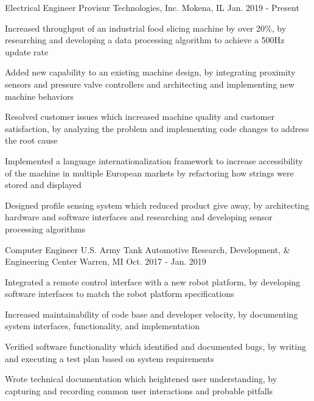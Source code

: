 

\begin{cventries}

  \cventry
    {Electrical Engineer} %
    {Provisur Technologies, Inc.} %
    {Mokena, IL} %
    {Jan. 2019 - Present} %
    {
      \begin{cvitems} %
        \item Increased throughput of an industrial food slicing machine by over 20\%, by researching and developing a data processing algorithm to achieve a 500Hz update rate
        \item Added new capability to an existing machine design, by integrating proximity sensors and pressure valve controllers and architecting and implementing new machine behaviors
        \item Resolved customer issues which increased machine quality and customer satisfaction, by analyzing the problem and implementing code changes to address the root cause
        \item Implemented a language internationalization framework to increase accessibility of the machine in multiple European markets by refactoring how strings were stored and displayed
        \item Designed profile sensing system which reduced product give away, by architecting hardware and software interfaces and researching and developing sensor processing algorithms
      \end{cvitems}
    }

  \cventry
    {Computer Engineer} %
    {U.S. Army Tank Automotive Research, Development, \& Engineering Center} %
    {Warren, MI} %
    {Oct. 2017 - Jan. 2019} %
    {
      \begin{cvitems} %
        \item Integrated a remote control interface with a new robot platform, by developing software interfaces to match the robot platform specifications
        \item Increased maintainability of code base and developer velocity, by documenting system interfaces, functionality, and implementation
        \item Verified software functionality which identified and documented bugs, by writing and executing a test plan based on system requirements
        \item Wrote technical documentation which heightened user understanding, by capturing and recording common user interactions and probable pitfalls
      \end{cvitems}
    }

\end{cventries}
